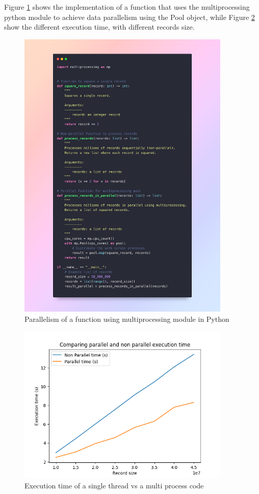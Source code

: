 \documentclass[11pt, oneside]{article}   	%
\begin{document}
Figure \ref{fig:para} shows the implementation of a function that uses the multiprocessing python module to achieve data parallelism using the Pool object, while Figure \ref{fig:execute} show the different execution time, with different records size.

\begin{figure}[H] %
   \centering
   \includegraphics[width=4in]{images/para_code} 
   \caption{Parallelism of a function using multiprocessing module in Python}
   \label{fig:para}
\end{figure}

\begin{figure}[H] %
   \centering
   \includegraphics[width=4in]{images/compare} 
   \caption{Execution time of a single thread vs a multi process code}
   \label{fig:execute}
\end{figure}
\end{document}
